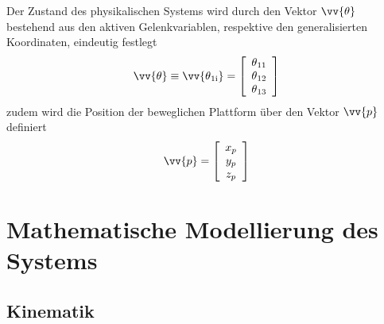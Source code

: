 \documentclass[Bachelor, BMR, ngerman]{twbook}
\begin{document}
    \noindent
    Der Zustand des physikalischen Systems wird durch den Vektor $\vv{\theta}$ bestehend aus den aktiven Gelenkvariablen, respektive den generalisierten Koordinaten, eindeutig festlegt 
    \begin{align}
        \vv{\theta} \equiv \vv{\theta\textsubscript{1i}} = 
            \left[
                \begin{array}{c} 
                    \theta\textsubscript{11} \\ 
                    \theta\textsubscript{12} \\ 
                    \theta\textsubscript{13} 
                \end{array}
            \right]
        \label{eq:aktive_gelenkvariablen}
    \end{align}
    \noindent
    zudem wird die Position der beweglichen Plattform über den Vektor $\vv{p}$ definiert
    \begin{align}
        \vv{p} = 
            \left[
                \begin{array}{c} 
                    x_p\\
                    y_p\\
                    z_p 
                \end{array}
            \right]
        \label{eq:tcp}
    \end{align}
    \noindent
    

\chapter{Mathematische Modellierung des Systems}
\label{cap:mathematische-modellierung}

    \section{Kinematik}
    
\end{document}
